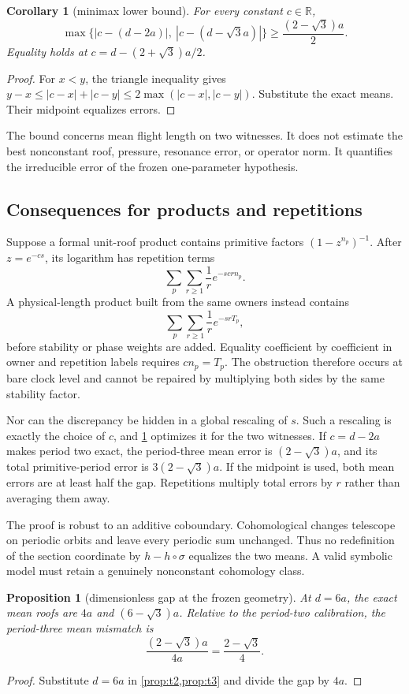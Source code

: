 \documentclass[11pt,a4paper]{article}
\newtheorem{proposition}[theorem]{Proposition}
\newtheorem{corollary}[theorem]{Corollary}
\theoremstyle{definition}
\theoremstyle{remark}
\begin{document}
\begin{corollary}[minimax lower bound]\label{cor:minimax}
For every constant \(c\in\mathbb R\),
\[
 \max\{|c-(d-2a)|,\ |c-(d-\sqrt3a)|\}
 \ge \frac{(2-\sqrt3)a}{2}.
\]
Equality holds at \(c=d-(2+\sqrt3)a/2\).
\end{corollary}
\begin{proof}
For \(x<y\), the triangle inequality gives
\(y-x\le|c-x|+|c-y|\le2\max(|c-x|,|c-y|)\). Substitute the exact means. Their midpoint equalizes errors.
\end{proof}

The bound concerns mean flight length on two witnesses. It does not estimate the best nonconstant roof, pressure, resonance error, or operator norm. It quantifies the irreducible error of the frozen one-parameter hypothesis.

\subsection{Consequences for products and repetitions}

Suppose a formal unit-roof product contains primitive factors \((1-z^{n_p})^{-1}\). After \(z=e^{-cs}\), its logarithm has repetition terms
\[
 \sum_p\sum_{r\ge1}\frac{1}{r}e^{-scrn_p}.
\]
A physical-length product built from the same owners instead contains
\[
 \sum_p\sum_{r\ge1}\frac{1}{r}e^{-srT_p},
\]
before stability or phase weights are added. Equality coefficient by coefficient in owner and repetition labels requires \(cn_p=T_p\). The obstruction therefore occurs at bare clock level and cannot be repaired by multiplying both sides by the same stability factor.

Nor can the discrepancy be hidden in a global rescaling of \(s\). Such a rescaling is exactly the choice of \(c\), and \cref{cor:minimax} optimizes it for the two witnesses. If \(c=d-2a\) makes period two exact, the period-three mean error is \((2-\sqrt3)a\), and its total primitive-period error is \(3(2-\sqrt3)a\). If the midpoint is used, both mean errors are at least half the gap. Repetitions multiply total errors by \(r\) rather than averaging them away.

The proof is robust to an additive coboundary. Cohomological changes telescope on periodic orbits and leave every periodic sum unchanged. Thus no redefinition of the section coordinate by \(h-h\circ\sigma\) equalizes the two means. A valid symbolic model must retain a genuinely nonconstant cohomology class.

\begin{proposition}[dimensionless gap at the frozen geometry]
At \(d=6a\), the exact mean roofs are \(4a\) and \((6-\sqrt3)a\). Relative to the period-two calibration, the period-three mean mismatch is
\[
 \frac{(2-\sqrt3)a}{4a}=\frac{2-\sqrt3}{4}.
\]
\end{proposition}
\begin{proof}
Substitute \(d=6a\) in \cref{prop:t2,prop:t3} and divide the gap by \(4a\).
\end{proof}
\end{document}
